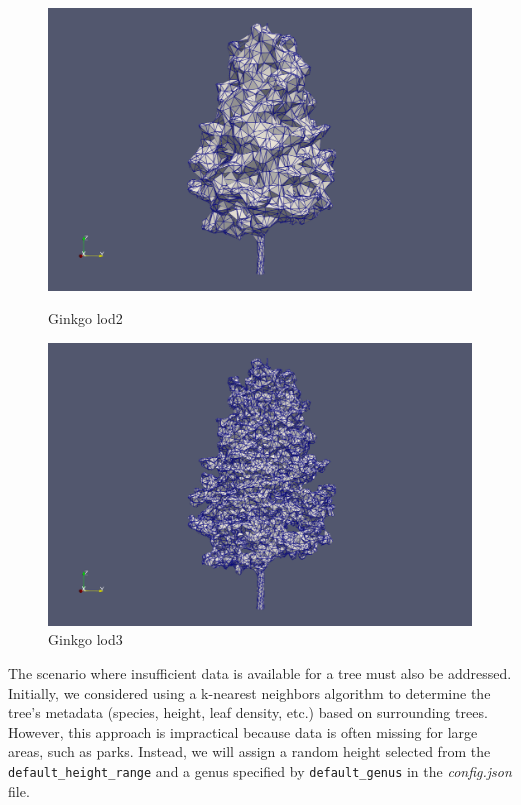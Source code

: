 \documentclass[12pt]{article}
\begin{document}
\begin{figure}[H]
    \centering
    \begin{minipage}{0.45\textwidth}
        \centering
        \includegraphics[width=1\textwidth]{images/gingko_lod2.png}
        \caption{Ginkgo lod2}
    \end{minipage}\hfill
    \begin{minipage}{0.45\textwidth}
        \centering
        \includegraphics[width=1\textwidth]{images/gingko_lod3.png}
        \caption{Ginkgo lod3}
    \end{minipage}
\end{figure}

The scenario where insufficient data is available for a tree must also be
addressed. Initially, we considered using a k-nearest neighbors
algorithm\cite{k-nn} to determine the tree's metadata (species, height,
leaf density, etc.) based on surrounding trees. However, this approach is
impractical because data is often missing for large areas, such as parks.
Instead, we will assign a random height selected from the
\texttt{default\_height\_range} and a genus specified by
\texttt{default\_genus} in the \textit{config.json} file.
\end{document}
